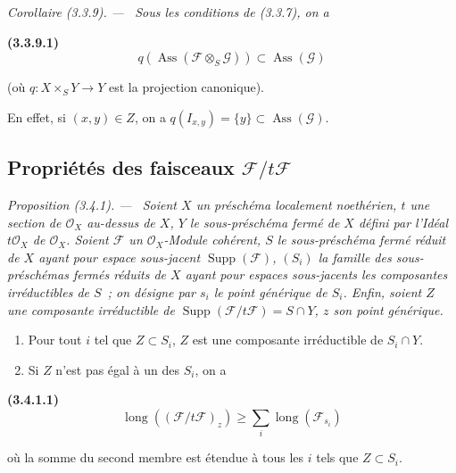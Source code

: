 \documentclass[10pt,oneside]{book}
\newcommand{\oldpage}[2][]{%
  \setcounter{footnote}{0}%
  \marginpar{\scriptsize\textbf{#1}~|~#2}\ignorespaces}
\newenvironment{env}[1][]{\par\medskip\noindent\textbf{(#1)}\ }{\par}
\newenvironment{proposition}[1][]{%
  \par\medskip\noindent\itshape Proposition (#1). ---\ }{\par}
\newenvironment{corollary}[1][]{%
  \par\medskip\noindent\itshape Corollaire (#1). ---\ }{\par}
\begin{document}
\begin{corollary}[3.3.9]
\label{IV.2.3.3.9-fr}
Sous les conditions de (3.3.7), on a
\end{corollary}

\begin{env}[3.3.9.1]
\label{IV.2.3.3.9.1-fr}
\[
q(\operatorname{Ass}(\mathcal F\otimes_S\mathcal G))
\subset\operatorname{Ass}(\mathcal G)
\]
\end{env}

(où $q:X\times_S Y\to Y$ est la projection canonique).

En effet, si $(x,y)\in Z$, on a
$q(I_{x,y})=\{y\}\subset\operatorname{Ass}(\mathcal G)$.

\oldpage[IV-2]{46}

\subsection{\texorpdfstring{Propriétés des faisceaux $\mathcal F/t\mathcal F$}{Propriétés des faisceaux F/tF}}

\begin{proposition}[3.4.1]
\label{IV.2.3.4.1-fr}
Soient $X$ un préschéma localement noethérien, $t$ une section de
$\mathcal O_X$ au-dessus de $X$, $Y$ le sous-préschéma fermé de $X$ défini par
l'Idéal $t\mathcal O_X$ de $\mathcal O_X$. Soient $\mathcal F$ un
$\mathcal O_X$-Module cohérent, $S$ le sous-préschéma fermé réduit de $X$ ayant
pour espace sous-jacent $\operatorname{Supp}(\mathcal F)$, $(S_i)$ la famille
des sous-préschémas fermés réduits de $X$ ayant pour espaces sous-jacents les
composantes irréductibles de $S$~; on désigne par $s_i$ le point générique de
$S_i$. Enfin, soient $Z$ une composante irréductible de
$\operatorname{Supp}(\mathcal F/t\mathcal F)=S\cap Y$, $z$ son point
générique.
\begin{enumerate}
\item[(i)] Pour tout $i$ tel que $Z\subset S_i$, $Z$ est une composante
irréductible de $S_i\cap Y$.
\item[(ii)] Si $Z$ n'est pas égal à un des $S_i$, on a
\end{enumerate}
\end{proposition}

\begin{env}[3.4.1.1]
\label{IV.2.3.4.1.1-fr}
\[
\operatorname{long}((\mathcal F/t\mathcal F)_z)
\geqslant\sum_i\operatorname{long}(\mathcal F_{s_i})
\]
\end{env}

où la somme du second membre est étendue à tous les $i$ tels que
$Z\subset S_i$.
\end{document}
